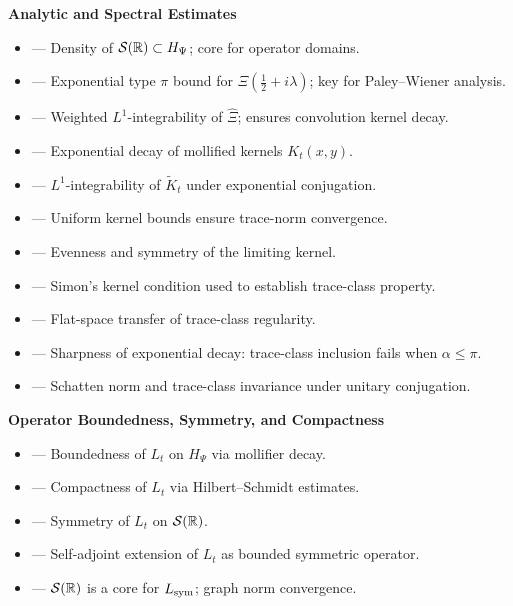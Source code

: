 \textbf{Analytic and Spectral Estimates}
\begin{itemize}
  \item {} — Density of \( \mathcal{S}(\mathbb{R}) \subset H_{\Psi} \); core for operator domains.
  \item {} — Exponential type \( \pi \) bound for \( \Xi(\tfrac{1}{2} + i\lambda) \); key for Paley--Wiener analysis.
  \item {} — Weighted \( L^1 \)-integrability of \( \widehat{\Xi} \); ensures convolution kernel decay.
  \item {} — Exponential decay of mollified kernels \( K_t(x,y) \).
  \item {} — \( L^1 \)-integrability of \( \widetilde{K}_t \) under exponential conjugation.
  \item {} — Uniform kernel bounds ensure trace-norm convergence.
  \item {} — Evenness and symmetry of the limiting kernel.
  \item {} — Simon’s kernel condition used to establish trace-class property.
  \item {} — Flat-space transfer of trace-class regularity.
  \item {} — Sharpness of exponential decay: trace-class inclusion fails when \( \alpha \le \pi \).
  \item {} — Schatten norm and trace-class invariance under unitary conjugation.
\end{itemize}

\textbf{Operator Boundedness, Symmetry, and Compactness}
\begin{itemize}
  \item {} — Boundedness of \( L_t \) on \( H_\Psi \) via mollifier decay.
  \item {} — Compactness of \( L_t \) via Hilbert--Schmidt estimates.
  \item {} — Symmetry of \( L_t \) on \( \mathcal{S}(\mathbb{R}) \).
  \item {} — Self-adjoint extension of \( L_t \) as bounded symmetric operator.
  \item {} — \( \mathcal{S}(\mathbb{R}) \) is a core for \( L_{\mathrm{sym}} \); graph norm convergence.
\end{itemize}

